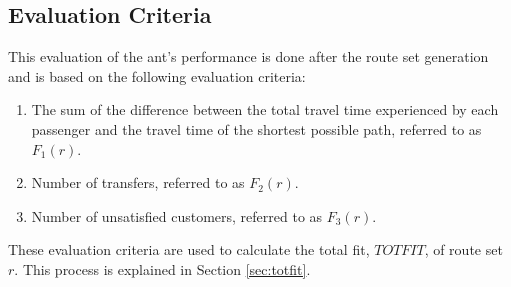 \subsection{Evaluation Criteria} 
This evaluation of the ant's performance is done after the route set generation and is based on the following evaluation criteria:
\begin{enumerate}
\item \label{itm:criteriaTotalTravelTime} The sum of the difference between the total travel time experienced by each passenger and the travel time of the shortest possible path, referred to as $F_1(r)$.
\item \label{itm:f2} Number of transfers, referred to as $F_2(r)$.
\item Number of unsatisfied customers, referred to as $F_3(r)$. 
\end{enumerate}
These evaluation criteria are used to calculate the total fit, $TOTFIT$, of route set $r$. This process is explained in Section \vref{sec:totfit}.



